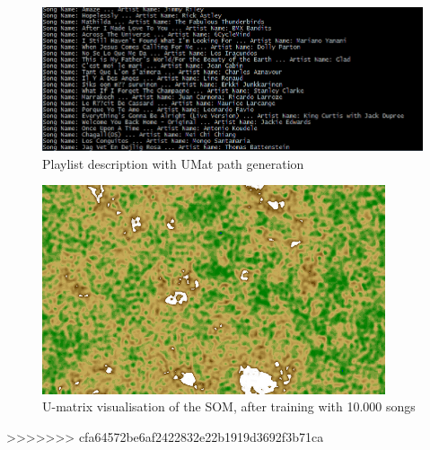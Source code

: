 \begin{figure}[h]
    \centering
    \includegraphics[width=\textwidth]{figures/UMatSongs.PNG}
    \caption{Playlist description with UMat path generation}
    \label{fig:umatres}
\end{figure}

\newpage

\begin{figure}[h!]
    \centering
    \includegraphics[angle=90, width=0.9\textwidth]{figures/map.jpg}
    \caption{U-matrix visualisation of the SOM, after training with 10.000 songs}
    \label{fig:map}
\end{figure}
>>>>>>> cfa64572be6af2422832e22b1919d3692f3b71ca
